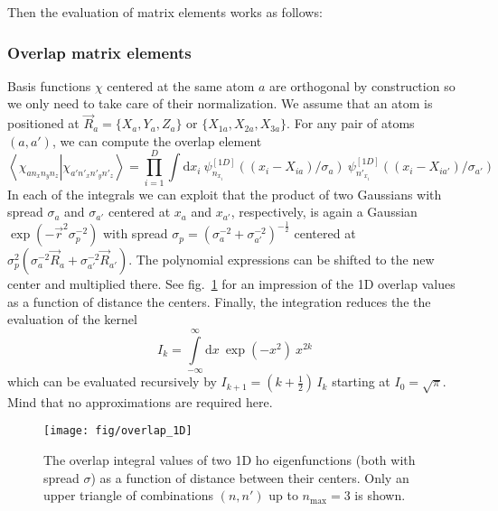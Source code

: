 \documentclass[oribibl]{llncs}
\newcommand{\um}[1]{_{\mathrm{#1}}}
\newcommand{\braket}[2]{\left\langle \left. #1 \right| #2 \right\rangle}
\begin{document}
Then the evaluation of matrix elements works as follows:

\subsubsection{Overlap matrix elements}
Basis functions $\chi$ centered at the same atom $a$ are orthogonal by construction
so we only need to take care of their normalization.
We assume that an atom is positioned at $\vec R_a = \{ X_a, Y_a, Z_a \}$ or $\{ X_{1a}, X_{2a}, X_{3a} \}$.
For any pair of atoms $(a,a')$, we can compute the overlap element
\begin{equation}
  \braket{ \chi_{a n_x n_y n_z} }{ \chi_{a' n'_x n'_y n'_z} } = \prod_{i=1}^D
  \int\mathrm d x_i \  \psi^{[1D]}_{n_{x_i}}((x_i - X_{ia})/\sigma_a)
                    \  \psi^{[1D]}_{n'_{x_i}}((x_i - X_{ia'})/\sigma_{a'})
  \label{eqn:overlap-factorized}
\end{equation}
In each of the integrals we can exploit that the product 
of two Gaussians with spread $\sigma_a$ and $\sigma_{a'}$ 
centered at $x_a$ and $x_{a'}$, respectively, 
is again a Gaussian $\exp(-\vec r^2 \sigma_p^{-2})$ with spread $\sigma_p = \left(\sigma_a^{-2} + \sigma_{a'}^{-2}\right)^{-\frac12}$
centered at $\sigma_p^2 \left( \sigma_a^{-2} \vec R_a + \sigma_{a'}^{-2} \vec R_{a'} \right)$.
The polynomial expressions can be shifted to the new center and multiplied there.
See fig.~\ref{fig:overlap_1D} for an impression of the 1D overlap values 
as a function of distance the centers.
Finally, the integration reduces the the evaluation of the kernel
\begin{equation}
  I_k = \int\limits_{-\infty}^{\infty} \mathrm d x \  \exp(-x^2) \  x^{2k}
  \label{eqn:gauss-integral-kernel}
\end{equation}
which can be evaluated recursively by $I_{k+1} = (k + \frac12)\,I_k$ starting at $I_0 = \sqrt{\pi}$.
Mind that no approximations are required here.
%
\begin{figure}
  \begin{minipage}[c]{.990\textwidth}
	\texttt{[image: fig/overlap\_1D]} %
  \end{minipage}\hfill
  \begin{minipage}[c]{.009\textwidth}
  \end{minipage}
  \label{fig:overlap_1D}
  \caption{
	The overlap integral values of two 1D \ac{ho} eigenfunctions (both with spread $\sigma$)
	as a function of distance between their centers.
	Only an upper triangle of combinations $(n,n')$ up to $n\um{max} = 3$ is shown.
  }
\end{figure}
%
%
\end{document}
